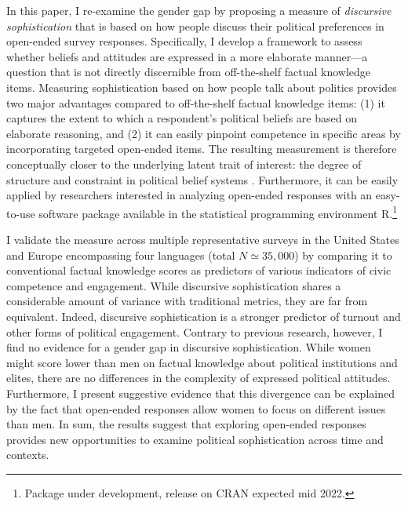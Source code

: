 In this paper, I re-examine the gender gap by proposing a measure of \textit{discursive sophistication} that is based on how people discuss their political preferences in open-ended survey responses. Specifically, I develop a framework to assess whether beliefs and attitudes are expressed in a more elaborate manner---a question that is not directly discernible from off-the-shelf factual knowledge items. %
Measuring sophistication based on how people talk about politics provides two major advantages compared to off-the-shelf factual knowledge items: (1) it captures the extent to which a respondent's political beliefs are based on elaborate reasoning, and (2) it can easily pinpoint competence in specific areas by incorporating targeted open-ended items. The resulting measurement is therefore conceptually closer to the underlying latent trait of interest: the degree of structure and constraint in political belief systems \citep{tetlock1983cognitive,luskin1987measuring}. Furthermore, it can be easily applied by researchers interested in analyzing open-ended responses with an easy-to-use software package available in the statistical programming environment R.\footnote{Package under development, release on CRAN expected mid 2022.}

I validate the measure across multiple representative surveys in the United States and Europe encompassing four languages (total $N \simeq 35,000$) by comparing it to conventional factual knowledge scores as predictors of various indicators of civic competence and engagement. While discursive sophistication shares a considerable amount of variance with traditional metrics, they are far from equivalent. Indeed, discursive sophistication is a stronger predictor of turnout and other forms of political engagement. Contrary to previous research, however, I find no evidence for a gender gap in discursive sophistication. While women might score lower than men on factual knowledge about political institutions and elites, there are no differences in the complexity of expressed political attitudes. Furthermore, I present suggestive evidence that this divergence can be explained by the fact that open-ended responses allow women to focus on different issues than men. In sum, the results suggest that exploring open-ended responses provides new opportunities to examine political sophistication across time and contexts.


